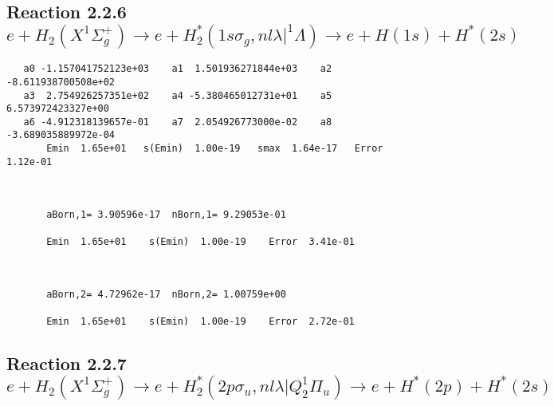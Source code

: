 \documentclass[12pt]{article}
\begin{document}
\newpage
\subsection{
Reaction 2.2.6 $e + H_2(X^1\Sigma_g^+) \rightarrow e + H_2^*(1s\sigma_g,nl\lambda|^1\Lambda) \rightarrow e +  H(1s) + H^*(2s)$}
















\begin{small}\begin{verbatim}
   a0 -1.157041752123e+03    a1  1.501936271844e+03    a2 -8.611938700508e+02
   a3  2.754926257351e+02    a4 -5.380465012731e+01    a5  6.573972423327e+00
   a6 -4.912318139657e-01    a7  2.054926773000e-02    a8 -3.689035889972e-04
       Emin  1.65e+01   s(Emin)  1.00e-19   smax  1.64e-17   Error  1.12e-01



       aBorn,1= 3.90596e-17  nBorn,1= 9.29053e-01

       Emin  1.65e+01    s(Emin)  1.00e-19    Error  3.41e-01



       aBorn,2= 4.72962e-17  nBorn,2= 1.00759e+00

       Emin  1.65e+01    s(Emin)  1.00e-19    Error  2.72e-01
\end{verbatim}\end{small}






\newpage
\subsection{
Reaction 2.2.7 $ e+H_2(X^1\Sigma_g^+) \rightarrow e + H_2^*(2p\sigma_u, nl\lambda|Q_2^1\Pi_u) \rightarrow e + H^*(2p) + H^*(2s)$}






\end{document}
